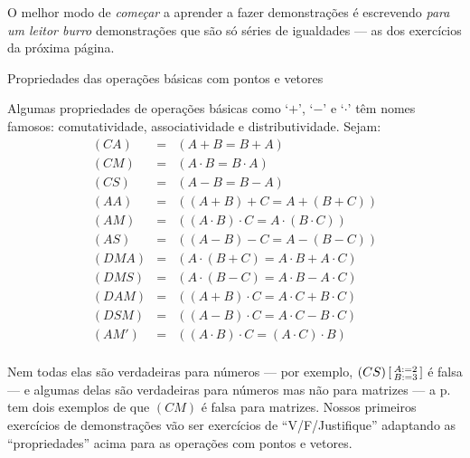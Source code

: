 \documentclass[oneside]{book}
\begin{document}
O melhor modo de {\sl começar} a aprender a fazer demonstrações é
escrevendo {\sl para um leitor burro} demonstrações que são só séries
de igualdades --- as dos exercícios da próxima página.


\newpage

%
 {Propriedades das operações básicas com pontos e vetores}

\def\eqo#1{\overset{#1}{=}}
\def\eqq{\eqo{?}}
\def\eqN{\eqo{\text{NÃO!}}}
\def\pab{(a,b)}
\def\pcd{(c,d)}
\def\pef{(e,f)}
\def\vab{\VEC{a,b}}
\def\vcd{\VEC{c,d}}
\def\vef{\VEC{e,f}}

Algumas propriedades de operações básicas como `$+$', `$-$' e `$·$'
têm nomes famosos: comutatividade, associatividade e distributividade.
Sejam:
%
$$\begin{array}{rcl}
  (CA) &=& (A+B = B+A) \\
  (CM) &=& (A·B = B·A) \\
  (CS) &=& (A-B = B-A) \\
  (AA) &=& ((A+B)+C = A+(B+C)) \\
  (AM) &=& ((A·B)·C = A·(B·C)) \\
  (AS) &=& ((A-B)-C = A-(B-C)) \\
  (DMA) &=& (A·(B+C) = A·B+A·C) \\
  (DMS) &=& (A·(B-C) = A·B-A·C) \\
  (DAM) &=& ((A+B)·C = A·C+B·C) \\
  (DSM) &=& ((A-B)·C = A·C-B·C) \\
  (AM') &=& ((A·B)·C = (A·C)·B) \\
  \end{array}
$$

Nem todas elas são verdadeiras para números --- por exemplo, $(CS)
\left[\begin {smallmatrix}A:=2\\B:=3\end{smallmatrix}\right]$ é falsa --- e algumas delas são verdadeiras para
números mas não para matrizes --- a p.\pageref{matrizes} tem dois
exemplos de que $(CM)$ é falsa para matrizes. Nossos primeiros
exercícios de demonstrações vão ser exercícios de ``V/F/Justifique''
adaptando as ``propriedades'' acima para as operações com pontos e
vetores.
\end{document}
